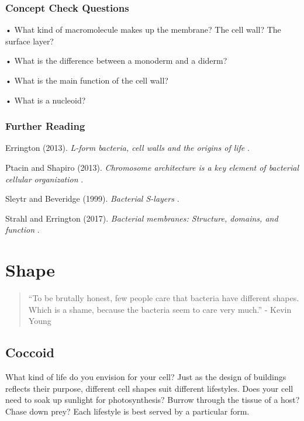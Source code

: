 \documentclass[]{tufte-book}
\begin{document}
\hypertarget{concept-check-questions-1}{%
\subsection*{Concept Check Questions}\label{concept-check-questions-1}}

• What kind of macromolecule makes up the membrane? The cell wall? The surface layer?

• What is the difference between a monoderm and a diderm?

• What is the main function of the cell wall?

• What is a nucleoid?

\hypertarget{further-reading-1}{%
\subsection*{Further Reading}\label{further-reading-1}}

Errington (2013). \emph{L-form bacteria, cell walls and the origins of life} \citep{errington2013}.

Ptacin and Shapiro (2013). \emph{Chromosome architecture is a key element of bacterial cellular organization} \citep{ptacin2013}.

Sleytr and Beveridge (1999). \emph{Bacterial S-layers} \citep{sleytr1999}.

Strahl and Errington (2017). \emph{Bacterial membranes: Structure, domains, and function} \citep{strahl2017}.

\hypertarget{shape}{%
\chapter{Shape}\label{shape}}

\begin{quote}
``To be brutally honest, few people care that bacteria have different shapes. Which is a shame, because the bacteria seem to care very much.''
- Kevin Young \citep{young2006}
\end{quote}

\hypertarget{coccoid}{%
\section{Coccoid}\label{coccoid}}

What kind of life do you envision for your cell? Just as the design of buildings reflects their purpose, different cell shapes suit different lifestyles. Does your cell need to soak up sunlight for photosynthesis? Burrow through the tissue of a host? Chase down prey? Each lifestyle is best served by a particular form.
\end{document}
